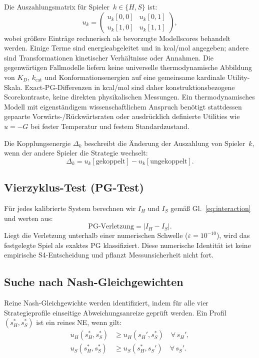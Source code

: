 \documentclass[12pt,a4paper]{article}
\begin{document}
Die Auszahlungsmatrix für Spieler~$k \in \{H, S\}$ ist:
\begin{equation}
  u_k = \begin{pmatrix}
    u_k[0,0] & u_k[0,1] \\
    u_k[1,0] & u_k[1,1]
  \end{pmatrix},
\end{equation}
wobei größere Einträge rechnerisch als bevorzugte Modellscores behandelt
werden. Einige Terme sind energieabgeleitet und in kcal/mol angegeben;
andere sind Transformationen kinetischer Verhältnisse oder Annahmen.
Die gegenwärtigen Fallmodelle liefern keine universelle
thermodynamische Abbildung von $K_D$, $k_\text{cat}$ und
Konformationsenergien auf eine gemeinsame kardinale Utility-Skala.
Exact-PG-Differenzen in kcal/mol sind daher konstruktionsbezogene
Scorekontraste, keine direkten physikalischen Messungen. Ein
thermodynamisches Modell mit eigenständigem wissenschaftlichem Anspruch benötigt stattdessen gepaarte
Vorwärts-/Rückwärtsraten oder ausdrücklich definierte Utilities wie
$u=-G$ bei fester Temperatur und festem Standardzustand.

Die Kopplungsenergie $\Delta_k$ beschreibt die Änderung der Auszahlung
von Spieler~$k$, wenn der andere Spieler die Strategie wechselt:
\begin{equation}
  \Delta_k = u_k[\text{gekoppelt}] - u_k[\text{ungekoppelt}].
\end{equation}

\subsection{Vierzyklus-Test (PG-Test)}

Für jedes kalibrierte System berechnen wir $I_H$ und $I_S$ gemäß
Gl.~\eqref{eq:interaction} und werten aus:
\begin{equation}
  \text{PG-Verletzung} = |I_H - I_S|.
\end{equation}
Liegt die Verletzung unterhalb einer numerischen Schwelle
($\varepsilon = 10^{-10}$), wird das festgelegte Spiel als exaktes PG
klassifiziert. Diese numerische Identität ist keine empirische
S4-Entscheidung und pflanzt Messunsicherheit nicht fort.

\subsection{Suche nach Nash-Gleichgewichten}

Reine Nash-Gleichgewichte werden identifiziert, indem für alle vier
Strategieprofile einseitige Abweichungsanreize geprüft werden. Ein Profil
$(s_H^*, s_S^*)$ ist ein reines NE, wenn gilt:
\begin{align}
  u_H(s_H^*, s_S^*) &\geq u_H(s_H', s_S^*) \quad \forall\, s_H', \\
  u_S(s_H^*, s_S^*) &\geq u_S(s_H^*, s_S') \quad \forall\, s_S'.
\end{align}
\end{document}

